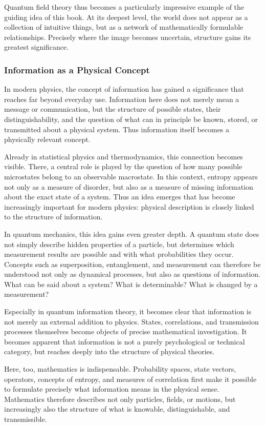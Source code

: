 Quantum field theory thus becomes
a particularly impressive example
of the guiding idea of this book.
At its deepest level, the world does not appear
as a collection of intuitive things,
but as a network of mathematically formulable relationships.
Precisely where the image becomes uncertain,
structure gains its greatest significance.
\newpage
\noindent
\subsubsection{Information as a Physical Concept}

In modern physics, the concept of information has gained a significance
that reaches far beyond everyday use.
Information here does not merely mean a message or communication,
but the structure of possible states,
their distinguishability,
and the question
of what can in principle be known,
stored,
or transmitted about a physical system.
Thus information itself becomes a physically relevant concept.

Already in statistical physics and thermodynamics,
this connection becomes visible.
There, a central role is played by the question
of how many possible microstates belong to an observable macrostate.
In this context, entropy appears not only as a measure of disorder,
but also as a measure of missing information
about the exact state of a system.
Thus an idea emerges
that has become increasingly important for modern physics:
physical description is closely linked
to the structure of information.

In quantum mechanics, this idea gains even greater depth.
A quantum state does not simply describe hidden properties of a particle,
but determines
which measurement results are possible
and with what probabilities they occur.
Concepts such as superposition,
entanglement,
and measurement
can therefore be understood not only as dynamical processes,
but also as questions of information.
What can be said about a system?
What is determinable?
What is changed by a measurement?

Especially in quantum information theory,
it becomes clear
that information is not merely an external addition to physics.
States,
correlations,
and transmission processes
themselves become objects of precise mathematical investigation.
It becomes apparent
that information is not a purely psychological or technical category,
but reaches deeply into the structure of physical theories.

Here, too, mathematics is indispensable.
Probability spaces,
state vectors,
operators,
concepts of entropy,
and measures of correlation
first make it possible
to formulate precisely what information means in the physical sense.
Mathematics therefore describes not only particles,
fields,
or motions,
but increasingly also the structure of what is knowable,
distinguishable,
and transmissible.

